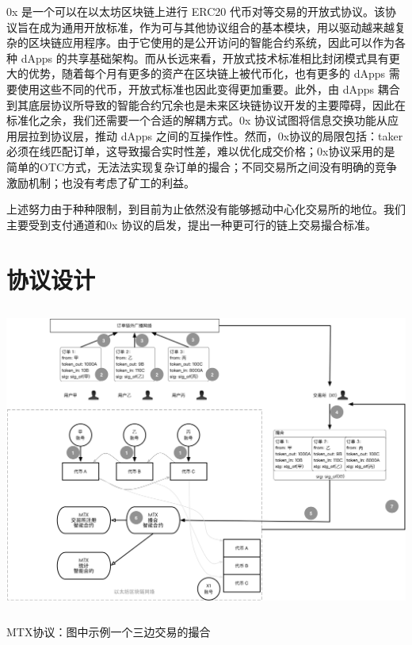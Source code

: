 \documentclass[UTF8,nofonts]{ctexart}
\makeatletter
\newenvironment{figurehere}
  {\def\@captype{figure}}
  {}
\makeatother
\begin{document}
0x \cite{warren20170x} 是一个可以在以太坊区块链上进行 ERC20 代币对等交易的开放式协议。该协议旨在成为通用开放标准，作为可与其他协议组合的基本模块，用以驱动越来越复杂的区块链应用程序。由于它使用的是公开访问的智能合约系统，因此可以作为各种 dApps 的共享基础架构。而从长远来看，开放式技术标准相比封闭模式具有更大的优势，随着每个月有更多的资产在区块链上被代币化，也有更多的 dApps 需要使用这些不同的代币，开放式标准也因此变得更加重要。此外，由 dApps 耦合到其底层协议所导致的智能合约冗余也是未来区块链协议开发的主要障碍，因此在标准化之余，我们还需要一个合适的解耦方式。0x 协议试图将信息交换功能从应用层拉到协议层，推动 dApps 之间的互操作性。然而，0x协议的局限包括：taker必须在线匹配订单，这导致撮合实时性差，难以优化成交价格；0x协议采用的是简单的OTC方式，无法法实现复杂订单的撮合；不同交易所之间没有明确的竞争激励机制；也没有考虑了矿工的利益。

上述努力由于种种限制，到目前为止依然没有能够撼动中心化交易所的地位。我们主要受到支付通道和0x 协议的启发，提出一种更可行的链上交易撮合标准。


\section{协议设计\label{sec:protocol}}

\begin{center}
\begin{figurehere}
\includegraphics[height=10cm]{images/mtx-protocol.png}
\caption{MTX协议：图中示例一个三边交易的撮合}
\label{fig:mtxprotocol}
\end{figurehere}
\end{center}
\end{document}
